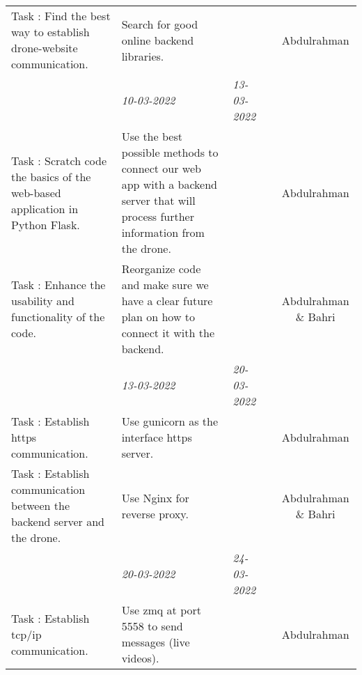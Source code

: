 \begin{center}
\begin{small}
\begin{xltabular}{\textwidth}{ p{3cm} p{5cm} X X c }
			Task \thesubcounter: 
			Find the best way to establish drone-website communication.
			& Search for good online backend libraries.
			& & & Abdulrahman \\
			
			\addlinespace
			
			
			
			
								\addlinespace
			& \emph{10-03-2022} & \emph{13-03-2022} & 
			\\ \addlinespace
			
			Task \thesubcounter: 
			Scratch code the basics of the web-based application in Python Flask.
			& Use the best possible methods to connect our web app with a backend server that will process further information from the drone.
			& & & Abdulrahman \\
			
			Task \thesubcounter: 
			Enhance the usability and functionality of the code.
			& Reorganize code and make sure we have a clear future plan on how to connect it with the backend.
			& & & Abdulrahman \& Bahri\\
			
			\addlinespace
			
			
									\addlinespace
			& \emph{13-03-2022} & \emph{20-03-2022} & 
			\\ \addlinespace
			
			Task \thesubcounter: 
			Establish https communication.
			& Use gunicorn as the interface https server.
			& & & Abdulrahman \\
			
			Task \thesubcounter: 
			Establish communication between the backend server and the drone.
			& Use Nginx for reverse proxy.
			& & & Abdulrahman \& Bahri\\
			
			\addlinespace
			
			\addlinespace
			
			
			\addlinespace
			& \emph{20-03-2022} & \emph{24-03-2022} & 
			\\ \addlinespace
			
			Task \thesubcounter: 
			Establish tcp/ip communication.
			& Use zmq at port 5558 to send messages (live videos).
			& & & Abdulrahman \\
			

\end{xltabular}
\end{small}
\end{center}
